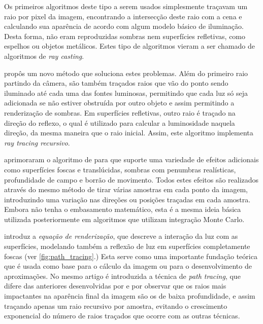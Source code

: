 \documentclass[tg]{mdtufsm}
\begin{document}
Os primeiros algoritmos deste tipo a serem usados simplesmente traçavam um raio por pixel da imagem,
encontrando a intersecção deste raio com a cena e calculando sua aparência de acordo com algum
modelo básico de iluminação. Desta forma, não eram reproduzidas sombras nem superfícies refletivas,
como espelhos ou objetos metálicos. Estes tipo de algoritmos vieram a ser chamado de algoritmos de
\emph{ray casting}.

 propôs um novo método que soluciona estes problemas. Além do primeiro raio
partindo da câmera, são também traçados raios que vão do ponto sendo iluminado até cada uma das
fontes luminosas, permitindo que cada luz só seja adicionada se não estiver obstruída por outro
objeto e assim permitindo a renderização de sombras. Em superfícies refletivas, outro raio é traçado
na direção do reflexo, o qual é utilizado para calcular a luminosidade naquela direção, da mesma
maneira que o raio inicial. Assim, este algoritmo implementa \emph{ray tracing recursivo}.

 aprimoraram o algoritmo de \citeauthor{whitted1980} para que suporte uma variedade
de efeitos adicionais como superfícies foscas e translúcidas, sombras com penumbras realísticas,
profundidade de campo e borrão de movimento. Todos estes efeitos são realizados através do mesmo
método de tirar várias amostras em cada ponto da imagem, introduzindo uma variação nas direções ou
posições traçadas em cada amostra. Embora não tenha o embasamento matemático, esta é a mesma ideia
básica utilizada posteriormente em algoritmos que utilizam integração Monte Carlo.

 introduz a \emph{equação de renderização}, que descreve a interação da luz com as
superfícies, modelando também a reflexão de luz em superfícies completamente foscas (ver
\autoref{fig:path_tracing}.) Esta serve como uma importante fundação teórica que é usada como base
para o cálculo da imagem ou para o desenvolvimento de aproximações. No mesmo artigo é introduzida a
técnica de \emph{path tracing}, que difere das anteriores desenvolvidas por \citeauthor{cook1984} e
\citeauthor{whitted1980} por observar que os raios mais impactantes na aparência final da imagem são
os de baixa profundidade, e assim traçando apenas um raio recursivo por amostra, evitando o
crescimento exponencial do número de raios traçados que ocorre com as outras técnicas.
\end{document}
